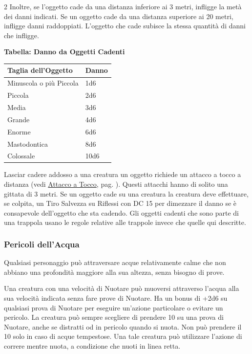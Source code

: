 \begin{multicols}{2}
Inoltre, se l'oggetto cade da una distanza inferiore ai 3 metri, infligge la metà dei danni indicati. Se un oggetto cade da una distanza superiore ai 20 metri, infligge danni raddoppiati. L'oggetto che cade subisce la stessa quantità di danni che infligge.

\bigskip

\textbf{Tabella: Danno da Oggetti Cadenti}

\medskip

\noindent\begin{tabularx}{\linewidth}{Xl}
	\toprule
\rowcolor{gray!20}\textbf{Taglia dell'Oggetto} & \textbf{Danno}\\
\toprule
Minuscola o più Piccola & 1d6\\
\rowcolor{gray!20}Piccola & 2d6\\
Media & 3d6\\
\rowcolor{gray!20}Grande & 4d6\\
Enorme & 6d6\\
\rowcolor{gray!20}Mastodontica & 8d6\\
Colossale & 10d6
\end{tabularx}

\bigskip

Lasciar cadere addosso a una creatura un oggetto richiede un attacco a tocco a distanza (vedi \hyperlink{attaccoatocco}{Attacco a Tocco}, pag. \pageref{attaccoatocco}). Questi attacchi hanno di solito una gittata di 3 metri. Se un oggetto cade su una creatura la creatura deve effettuare, se colpita, un Tiro Salvezza su Riflessi con DC 15 per dimezzare il danno se è consapevole dell'oggetto che sta cadendo. Gli oggetti cadenti che sono parte di una trappola usano le regole relative alle trappole invece che quelle qui descritte.

\subsubsection{Pericoli dell'Acqua}\hypertarget{pericoli-dellacqua}{}\label{pericoli-dellacqua} 

Qualsiasi personaggio può attraversare acque relativamente calme che non abbiano una profondità maggiore alla sua altezza, senza bisogno di prove.

Una creatura con una velocità di Nuotare può muoversi attraverso l'acqua alla sua velocità indicata senza fare prove di Nuotare. Ha un bonus di +2d6 su qualsiasi prova di Nuotare per eseguire un'azione particolare o evitare un pericolo.
La creatura può sempre scegliere di prendere 10 su una prova di Nuotare, anche se distratti od in pericolo quando si nuota. Non può prendere il 10 solo in caso di acque tempestose. Una tale creatura può utilizzare l'azione di correre mentre nuota, a condizione che nuoti in linea retta.


\end{multicols}
